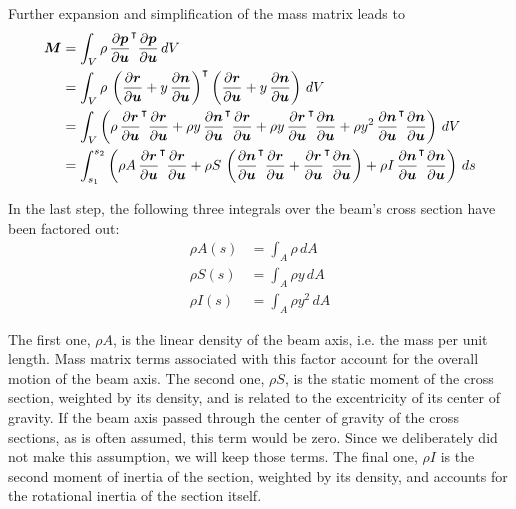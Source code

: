 Further expansion and simplification of the mass matrix leads to
%
\begin{align}
\boldsymbol{M} &= \int_{V} \rho\,\frac{\partial\boldsymbol{p}}{\partial\boldsymbol{u}}^\intercal\frac{\partial\boldsymbol{p}}{\partial\boldsymbol{u}}\,dV \notag \\
&= \int_{V} \rho\,\left(\frac{\partial\boldsymbol{r}}{\partial\boldsymbol{u}} + y\,\frac{\partial\boldsymbol{n}}{\partial\boldsymbol{u}}\right)^\intercal\left(\frac{\partial\boldsymbol{r}}{\partial\boldsymbol{u}} + y\,\frac{\partial\boldsymbol{n}}{\partial\boldsymbol{u}}\right)\,dV \notag \\
&= \int_{V} \left(\rho\,\frac{\partial\boldsymbol{r}}{\partial\boldsymbol{u}}^\intercal\frac{\partial\boldsymbol{r}}{\partial\boldsymbol{u}} + \rho y\,\frac{\partial\boldsymbol{n}}{\partial\boldsymbol{u}}^\intercal\frac{\partial\boldsymbol{r}}{\partial\boldsymbol{u}} + \rho y\,\frac{\partial\boldsymbol{r}}{\partial\boldsymbol{u}}^\intercal\frac{\partial\boldsymbol{n}}{\partial\boldsymbol{u}} + \rho y^2\,\frac{\partial\boldsymbol{n}}{\partial\boldsymbol{u}}^\intercal\frac{\partial\boldsymbol{n}}{\partial\boldsymbol{u}}\right)\,dV \notag \\
&= \int_{s_1}^{s_2} \left(\rho A\,\frac{\partial\boldsymbol{r}}{\partial\boldsymbol{u}}^\intercal\frac{\partial\boldsymbol{r}}{\partial\boldsymbol{u}} + \rho S\,\left(\frac{\partial\boldsymbol{n}}{\partial\boldsymbol{u}}^\intercal\frac{\partial\boldsymbol{r}}{\partial\boldsymbol{u}} + \frac{\partial\boldsymbol{r}}{\partial\boldsymbol{u}}^\intercal\frac{\partial\boldsymbol{n}}{\partial\boldsymbol{u}}\right) + \rho I\,\frac{\partial\boldsymbol{n}}{\partial\boldsymbol{u}}^\intercal\frac{\partial\boldsymbol{n}}{\partial\boldsymbol{u}}\right)\,ds
\end{align}

In the last step, the following three integrals over the beam's cross section have been factored out:
%
\begin{align}
\rho A(s) &= \int_A \rho\,dA \\
\rho S(s) &= \int_A \rho y\,dA \\
\rho I(s) &= \int_A \rho y^2\,dA
\end{align}

The first one, $\rho A$, is the linear density of the beam axis, i.e. the mass per unit length.
Mass matrix terms associated with this factor account for the overall motion of the beam axis.
The second one, $\rho S$, is the static moment of the cross section, weighted by its density, and is related to the excentricity of its center of gravity.
If the beam axis passed through the center of gravity of the cross sections, as is often assumed, this term would be zero.
Since we deliberately did not make this assumption, we will keep those terms.
The final one, $\rho I$ is the second moment of inertia of the section, weighted by its density, and accounts for the rotational inertia of the section itself.

